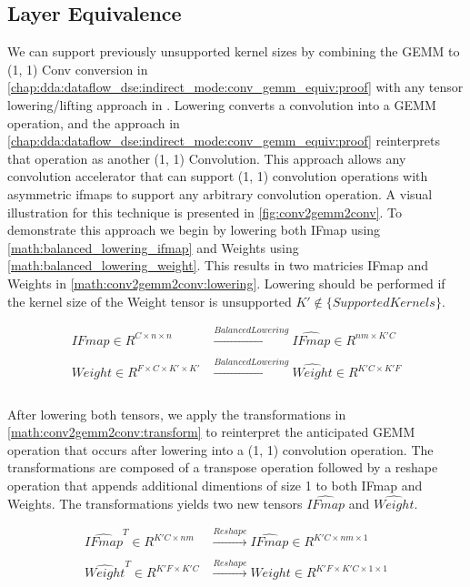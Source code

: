 \subsection{Layer Equivalence}
\label{chap:dda:dataflow_dse:indirect_mode:layer_equivelence}

We can support previously unsupported kernel sizes by combining the GEMM to (1, 1)
Conv conversion in
\autoref{chap:dda:dataflow_dse:indirect_mode:conv_gemm_equiv:proof} with any
tensor lowering/lifting approach in \cite{cafe_con_troll}. Lowering converts a
convolution into a GEMM operation, and the approach in
\autoref{chap:dda:dataflow_dse:indirect_mode:conv_gemm_equiv:proof} reinterprets
that operation as another (1, 1) Convolution. This approach allows any convolution
accelerator that can support (1, 1) convolution operations with asymmetric ifmaps
to support any arbitrary convolution operation. A visual illustration for this
technique is presented in \autoref{fig:conv2gemm2conv}. To demonstrate this
approach we begin by lowering both IFmap using
\autoref{math:balanced_lowering_ifmap} and Weights using
\autoref{math:balanced_lowering_weight}. This results in two matricies IFmap and
Weights in \autoref{math:conv2gemm2conv:lowering}. Lowering should be performed
if the kernel size of the Weight tensor is unsupported $K' \notin
\{SupportedKernels\}$. 

\begin{equation}
    \begin{aligned}
        IFmap \in R^{C\times n\times n} & \xrightarrow[]{Balanced Lowering} \hat{IFmap} \in R^{nm\times K'C} \\
        Weight \in R^{F\times C\times K' \times K'} & \xrightarrow[]{Balanced Lowering} \hat{Weight} \in R^{K'C\times K'F} \\
    \end{aligned}
    \label{math:conv2gemm2conv:lowering}
\end{equation}

After lowering both tensors, we apply the transformations in
\autoref{math:conv2gemm2conv:transform} to reinterpret the anticipated GEMM
operation that occurs after lowering into a (1, 1) convolution operation. The
transformations are composed of a transpose operation followed by a reshape
operation that appends additional dimentions of size 1 to both IFmap and
Weights. The transformations yields two new tensors $\hat{IFmap}$ and
$\hat{Weight}$.

\begin{equation}
    \begin{aligned}
        \hat{IFmap}^T \in R^{K'C \times nm} & \xrightarrow[]{Reshape} \hat{IFmap} \in R^{K'C \times nm \times 1} \\
        \hat{Weight}^T \in R^{K'F\times K'C} & \xrightarrow[]{Reshape} Weight \in R^{K'F\times K'C \times 1 \times 1} \\
        \end{aligned}
    \label{math:conv2gemm2conv:transform}
\end{equation}

